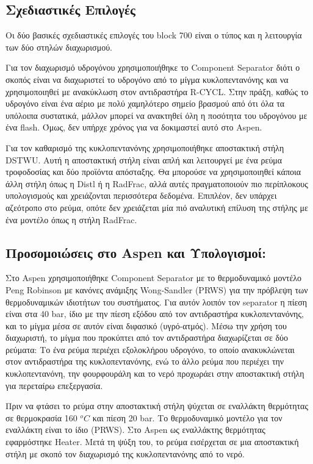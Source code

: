 \documentclass[11pt]{article}
\begin{document}
\subsection{Σχεδιαστικές Επιλογές}
\label{sec:orgfad37fa}
Οι δύο βασικές σχεδιαστικές επιλογές του block 700 είναι ο τύπος και η
λειτουργία των δύο στηλών διαχωρισμού.

Για τον διαχωρισμό υδρογόνου χρησιμοποιήθηκε το Component Separator
διότι ο σκοπός είναι να διαχωριστεί το υδρογόνο από το μίγμα
κυκλοπεντανόνης και να χρησιμοποιηθεί με ανακύκλωση στον αντιδραστήρα
R-CYCL. Στην πράξη, καθώς το υδρογόνο είναι ένα αέριο με πολύ χαμηλότερο σημείο βρασμού από ότι όλα τα υπόλοιπα συστατικά, μάλλον μπορεί να ανακτηθεί όλη η ποσότητα του υδρογόνου με ένα flash. Όμως, δεν υπήρχε χρόνος για να δοκιμαστεί αυτό στο Aspen.

Για τον καθαρισμό της κυκλοπεντανόνης χρησιμοποιήθηκε αποστακτική στήλη
DSTWU. Αυτή η αποστακτική στήλη είναι απλή και λειτουργεί με ένα ρεύμα
τροφοδοσίας και δύο προϊόντα απόσταξης. Θα μπορούσε να χρησιμοποιηθεί
κάποια άλλη στήλη όπως η Distl ή η RadFrac, αλλά αυτές πραγματοποιούν
πιο περίπλοκους υπολογισμούς και χρειάζονται περισσότερα δεδομένα.
Επιπλέον, δεν υπάρχει αζεότροπο στο ρεύμα, οπότε δεν χρειάζεται μία πιό αναλυτική επίλυση της στήλης με ένα μοντέλο όπως η στήλη RadFrac.

\subsection{Προσομοιώσεις στο Aspen και Υπολογισμοί:}
\label{sec:org9bb4a8a}
Στο Aspen χρησιμοποιήθηκε Component Separator με το θερμοδυναμικό
μοντέλο Peng Robinson με κανόνες ανάμιξης Wong-Sandler (PRWS) για την
πρόβλεψη των θερμοδυναμικών ιδιοτήτων του συστήματος. Για αυτόν λοιπόν
τον separator η πίεση είναι στα 40 bar, ίδιο με την πίεση εξόδου από τον
αντιδραστήρα κυκλοπεντανόνης, και το μίγμα μέσα σε αυτόν είναι διφασικό
(υγρό-ατμός). Μέσω την χρήση του διαχωριστή, το μίγμα που προκύπτει από
τον αντιδραστήρα διαχωρίζεται σε δύο ρεύματα: Το ένα ρεύμα περιέχει
εξολοκλήρου υδρογόνο, το οποίο ανακυκλώνεται στον αντιδραστήρα της
κυκλοπεντανόνης, ενώ το άλλο ρεύμα που περιέχει την κυκλοπεντανόνη, την
φουρφουράλη και το νερό προχωράει στην αποστακτική στήλη για περεταίρω
επεξεργασία.

Πριν να φτάσει το ρεύμα στην αποστακτική στήλη ψύχεται σε εναλλάκτη
θερμότητας σε θερμοκρασία 160 \(^oC\) και πίεση 20 bar. Το θερμοδυναμικό
μοντέλο για τον εναλλάκτη είναι το ίδιο (PRWS). Στο Aspen ως
εναλλάκτης θερμότητας εφαρμόστηκε Heater. Μετά τη ψύξη του, το ρεύμα
εισέρχεται σε μια αποστακτική στήλη με σκοπό τον διαχωρισμό της
κυκλοπεντανόνης από το νερό.
\end{document}
